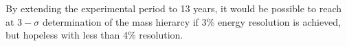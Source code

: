 By extending the experimental period to
13 years, it would be possible to reach at $3-\sigma$ determination of
the mass hierarcy if 3\% energy resolution is achieved, but hopeless
with less than 4\%
resolution.
